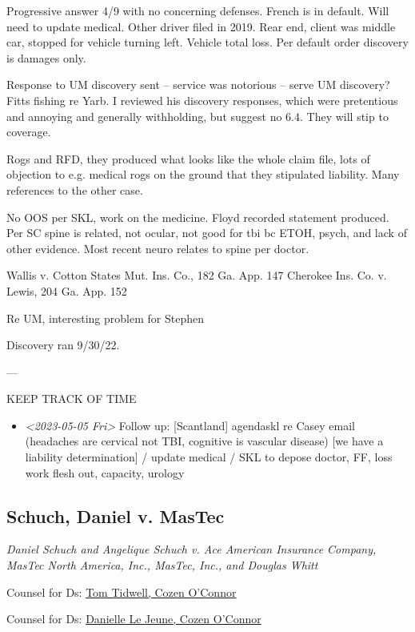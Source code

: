 \documentclass[11pt]{article}
\begin{document}
Progressive answer 4/9 with no concerning defenses. French is in default. Will need to update medical. Other driver filed in 2019. Rear end, client was middle car, stopped for vehicle turning left. Vehicle total loss. Per default order discovery is damages only.

Response to UM discovery sent -- service was notorious -- serve UM discovery? Fitts fishing re Yarb. I reviewed his discovery responses, which were pretentious and annoying and generally withholding, but suggest no 6.4. They will stip to coverage.

Rogs and RFD, they produced what looks like the whole claim file, lots of objection to e.g. medical rogs on the ground that they stipulated liability. Many references to the other case.

No OOS per SKL, work on the medicine. Floyd recorded statement produced. Per SC spine is related, not ocular, not good for tbi bc ETOH, psych, and lack of other evidence. Most recent neuro relates to spine per doctor.

Wallis v. Cotton States Mut. Ins. Co., 182 Ga. App. 147
Cherokee Ins. Co. v. Lewis, 204 Ga. App. 152

Re UM, interesting problem for Stephen

Discovery ran 9/30/22. 

---

KEEP TRACK OF TIME

\begin{itemize}
\item \textit{<2023-05-05 Fri> } Follow up: [Scantland] agendaskl re Casey email (headaches are cervical not TBI, cognitive is vascular disease) [we have a liability determination] / update medical / SKL to depose doctor, FF, loss work flesh out, capacity, urology
\end{itemize}

\subsection*{Schuch, Daniel v. MasTec}
\label{sec:orgb1c3792}

\emph{Daniel Schuch and Angelique Schuch v. Ace American Insurance Company, MasTec North America, Inc., MasTec, Inc., and Douglas Whitt}

Counsel for Ds: \href{https://www.cozen.com/people/bios/tidwell-thomas}{Tom Tidwell, Cozen O'Connor}

Counsel for Ds: \href{https://gabar.reliaguide.com/lawyer/30309-GA-Danielle-LeJeune-277942}{Danielle Le Jeune, Cozen O'Connor}
\end{document}
